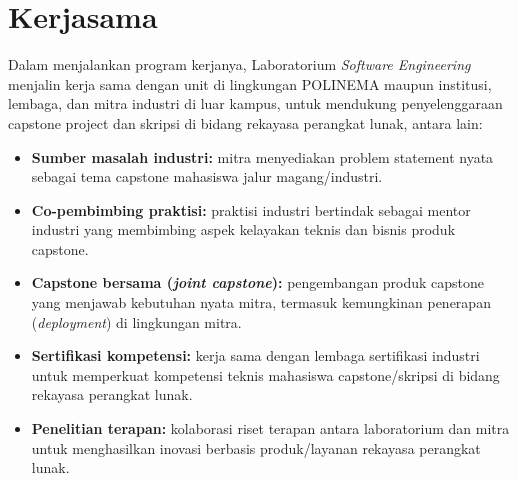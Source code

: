 \documentclass[12pt,a4paper]{report}
\begin{document}
\chapter{Kerjasama}

Dalam menjalankan program kerjanya, Laboratorium \emph{Software Engineering} menjalin kerja sama dengan unit di lingkungan POLINEMA maupun institusi, lembaga, dan mitra industri di luar kampus, untuk mendukung penyelenggaraan capstone project dan skripsi di bidang rekayasa perangkat lunak, antara lain:
\begin{itemize}
\item \textbf{Sumber masalah industri:} mitra menyediakan problem statement nyata sebagai tema capstone mahasiswa jalur magang/industri.
\item \textbf{Co-pembimbing praktisi:} praktisi industri bertindak sebagai mentor industri yang membimbing aspek kelayakan teknis dan bisnis produk capstone.
\item \textbf{Capstone bersama (\emph{joint capstone}):} pengembangan produk capstone yang menjawab kebutuhan nyata mitra, termasuk kemungkinan penerapan (\emph{deployment}) di lingkungan mitra.
\item \textbf{Sertifikasi kompetensi:} kerja sama dengan lembaga sertifikasi industri untuk memperkuat kompetensi teknis mahasiswa capstone/skripsi di bidang rekayasa perangkat lunak.
\item \textbf{Penelitian terapan:} kolaborasi riset terapan antara laboratorium dan mitra untuk menghasilkan inovasi berbasis produk/layanan rekayasa perangkat lunak.
\end{itemize}

\PedomanPengesahan
\end{document}
